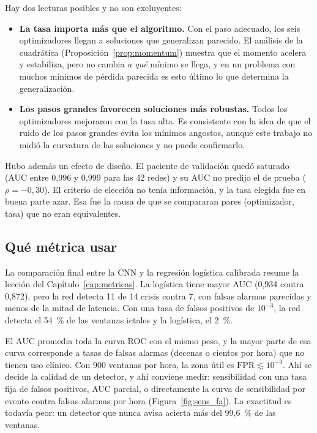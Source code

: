 Hay dos lecturas posibles y no son excluyentes:
\begin{itemize}
  \item \textbf{La tasa importa más que el algoritmo.} Con el paso adecuado, los seis optimizadores llegan a soluciones que
        generalizan parecido. El análisis de la cuadrática (Proposición~\ref{prop:momentum}) muestra que el momento acelera
        y estabiliza, pero no cambia \emph{a qué} mínimo se llega, y en un problema con muchos mínimos de pérdida parecida
        es esto último lo que determina la generalización.
  \item \textbf{Los pasos grandes favorecen soluciones más robustas.} Todos los optimizadores mejoraron con la tasa alta.
        Es consistente con la idea de que el ruido de los pasos grandes evita los mínimos angostos, aunque este trabajo no
        midió la curvatura de las soluciones y no puede confirmarlo.
\end{itemize}

Hubo además un efecto de diseño. El paciente de validación quedó saturado (AUC entre 0,996 y 0,999 para las 42 redes) y su
AUC no predijo el de prueba ($\rho = -0{,}30$). El criterio de elección no tenía información, y la tasa elegida fue en buena
parte azar. Esa fue la causa de que se compararan pares (optimizador, tasa) que no eran equivalentes.

\subsection{Qué métrica usar}

La comparación final entre la CNN y la regresión logística calibrada resume la lección del Capítulo~\ref{cap:metricas}.
La logística tiene mayor AUC (0,934 contra 0,872), pero la red detecta 11 de 14 crisis contra 7, con falsas alarmas
parecidas y menos de la mitad de latencia. Con una tasa de falsos positivos de $10^{-3}$, la red detecta el 54~\% de las
ventanas ictales y la logística, el 2~\%.

El AUC promedia toda la curva ROC con el mismo peso, y la mayor parte de esa curva corresponde a tasas de falsas alarmas
(decenas o cientos por hora) que no tienen uso clínico. Con 900 ventanas por hora, la zona útil es
$\text{FPR} \lesssim 10^{-3}$. Ahí se decide la calidad de un detector, y ahí conviene medir: sensibilidad con una tasa
fija de falsos positivos, AUC parcial, o directamente la curva de sensibilidad por evento contra falsas alarmas por hora
(Figura~\ref{fig:sens_fa}). La exactitud es todavía peor: un detector que nunca avisa acierta más del 99,6~\% de las ventanas.

